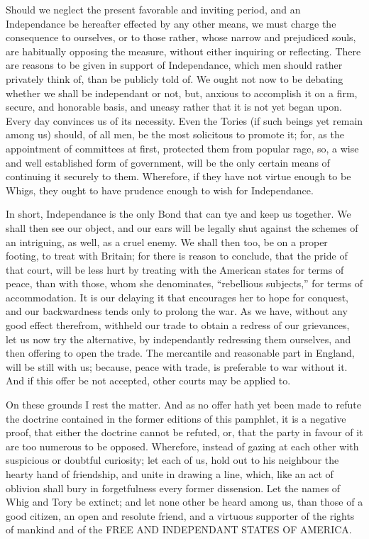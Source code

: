 \documentclass[12pt,oneside]{memoir}
\begin{document}
Should we neglect the present favorable and inviting period, and an Independance be hereafter effected by any other means, we must charge the consequence to ourselves, or to those rather, whose narrow and prejudiced souls, are habitually opposing the measure, without either inquiring or reflecting. There are reasons to be given in support of Independance, which men should rather privately think of, than be publicly told of. We ought not now to be debating whether we shall be independant or not, but, anxious to accomplish it on a firm, secure, and honorable basis, and uneasy rather that it is not yet began upon. Every day convinces us of its necessity. Even the Tories (if such beings yet remain among us) should, of all men, be the most solicitous to promote it; for, as the appointment of committees at first, protected them from popular rage, so, a wise and well established form of government, will be the only certain means of continuing it securely to them. Wherefore, if they have not virtue enough to be Whigs, they ought to have prudence enough to wish for Independance.

In short, Independance is the only Bond that can tye and keep us together. We shall then see our object, and our ears will be legally shut against the schemes of an intriguing, as well, as a cruel enemy. We shall then too, be on a proper footing, to treat with Britain; for there is reason to conclude, that the pride of that court, will be less hurt by treating with the American states for terms of peace, than with those, whom she denominates, ``rebellious subjects,'' for terms of accommodation. It is our delaying it that encourages her to hope for conquest, and our backwardness tends only to prolong the war. As we have, without any good effect therefrom, withheld our trade to obtain a redress of our grievances, let us now try the alternative, by independantly redressing them ourselves, and then offering to open the trade. The mercantile and reasonable part in England, will be still with us; because, peace with trade, is preferable to war without it. And if this offer be not accepted, other courts may be applied to.

On these grounds I rest the matter. And as no offer hath yet been made to refute the doctrine contained in the former editions of this pamphlet, it is a negative proof, that either the doctrine cannot be refuted, or, that the party in favour of it are too numerous to be opposed. Wherefore, instead of gazing at each other with suspicious or doubtful curiosity; let each of us, hold out to his neighbour the hearty hand of friendship, and unite in drawing a line, which, like an act of oblivion shall bury in forgetfulness every former dissension. Let the names of Whig and Tory be extinct; and let none other be heard among us, than those of a good citizen, an open and resolute friend, and a virtuous supporter of the rights of mankind and of the FREE AND INDEPENDANT STATES OF AMERICA.
\end{document}
